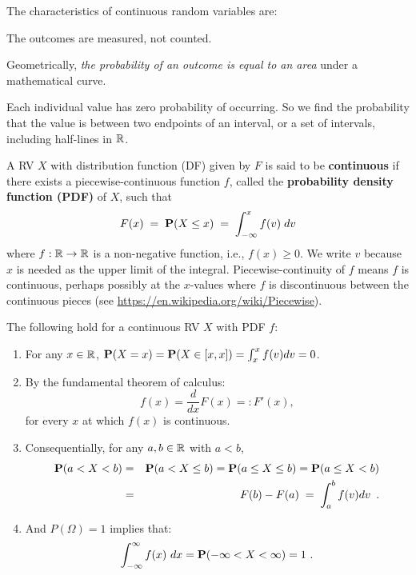  The characteristics of continuous random variables are:
\bit
\item  The outcomes are measured, not counted.
\item  Geometrically, {\em the probability of an outcome is equal to an area}
  under a mathematical curve.
\item  Each individual value has zero probability of occurring. So we find the probability
      that the value is between two endpoints of an interval, or a set of intervals, including half-lines in $\mathbb{R}$.
\eit

\begin{definition}\label{D:PDF}
A RV $X$ with distribution function (DF) given by $F$ is said to be {\bf continuous} if there exists a piecewise-continuous function $f$, called the {\bf probability density function (PDF)} of $X$, such that 
\begin{equation}\label{eqn:cdf_integral}
F(x)\;=\; \mathbf{P}(X\leq x)\;=\;\int_{-\infty}^x f(v) \;dv
\end{equation}
where $f: \mathbb{R} \to \mathbb{R}$ is a non-negative function, i.e., $f(x)\geq 0$. 
We write $v$ because $x$ is needed as the upper limit of the integral.
Piecewise-continuity of $f$ means $f$ is continuous, perhaps possibly at the $x$-values where $f$ is discontinuous between the continuous pieces (see \url{https://en.wikipedia.org/wiki/Piecewise}). 
\end{definition}

The following hold for a continuous RV $X$ with PDF $f$:
\begin{enumerate}
\item For any $x \in \mathbb{R}$, $\mathbf{P}(X=x)=\mathbf{P}(X \in [x,x]) = \int_x^x f(v)dv = 0$.
\item By the fundamental theorem of calculus:
\begin{equation}\label{eqn:density_dev_cdf}
f(x) = \frac{d}{dx} F(x) =: F'(x), 
\end{equation}
for every $x$ at which $f(x)$ is continuous.
\item Consequentially, for any $a,b \in \mathbb{R}$ with $a<b$,
\begin{eqnarray}\label{eqn:con_intval_prob}
\mathbf{P}(a < X < b ) &=& \mathbf{P}(a < X \leq b) = \mathbf{P}(a \leq X \leq b) = \mathbf{P}(a \leq X < b)\\
               &=& F(b)-F(a)\;=\;\int^b_a f(v)dv\enspace.
\end{eqnarray}
\item And $P(\Omega)=1$ implies that:
\[
\int_{-\infty}^{\infty} f(x) \ dx = \mathbf{P}(-\infty < X < \infty) = 1 \ .
\] 
\end{enumerate}


